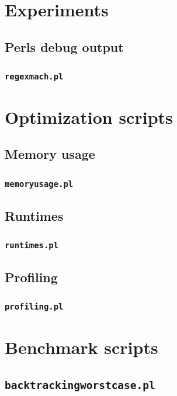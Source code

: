 \section{Experiments}
\subsection{Perls debug output}
\subsubsection{\texttt{regexmach.pl}}
\label{sec:regexmach.pl}



\section{Optimization scripts}
\subsection*{Memory usage}
\subsubsection*{\texttt{memoryusage.pl}}
\label{sec:memoryusage.pl}


\subsection*{Runtimes}
\subsubsection*{\texttt{runtimes.pl}}
\label{sec:runtimes.pl}


\subsection*{Profiling}
\subsubsection*{\texttt{profiling.pl}}
\label{sec:profiling.pl}



\section{Benchmark scripts}
\subsection*{\texttt{backtrackingworstcase.pl}}
\label{sec:backtrackingworstcase.pl}



